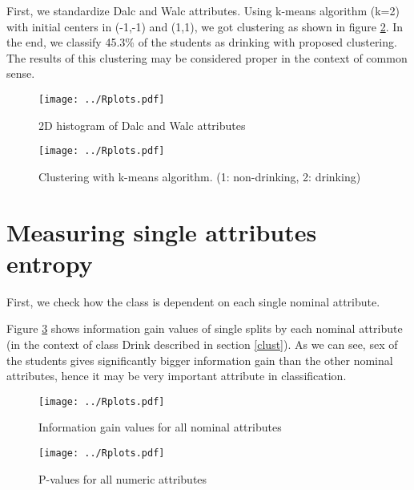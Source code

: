 \documentclass[a4paper]{article}
\begin{document}
First, we standardize Dalc and Walc attributes.
Using k-means algorithm (k=2) with initial centers in (-1,-1) and (1,1), we got clustering as shown in figure \ref{fig:clust}.
In the end, we classify 45.3\% of the students as drinking with proposed clustering.
The results of this clustering may be considered proper in the context of common sense.



\begin{figure}[!hbt]
    \centering
    \texttt{[image: ../Rplots.pdf]}
    \caption[]{2D histogram of Dalc and Walc attributes
    \label{fig:hist2D}
    }
\end{figure}

\begin{figure}[!hbt]
    \centering
    \texttt{[image: ../Rplots.pdf]}
    \caption[]{Clustering with k-means algorithm. (1: non-drinking, 2: drinking)
    \label{fig:clust}
    }
\end{figure}

\section{Measuring single attributes entropy}
\label{xent}
First, we check how the class is dependent on each single nominal attribute.

Figure \ref{fig:nominalIG} shows information gain values
of single splits by each nominal attribute (in the context of class Drink described in section \ref{clust}).
As we can see, sex of the students gives significantly bigger information gain
than the other nominal attributes, hence it may be very important attribute
in classification.

% 

\begin{figure}[!hbt]
    \centering
    \texttt{[image: ../Rplots.pdf]}
    \caption[]{Information gain values for all nominal attributes
    \label{fig:nominalIG}
    }
\end{figure}

\begin{figure}[!hbt]
    \centering
    \texttt{[image: ../Rplots.pdf]}
    \caption[]{P-values for all numeric attributes
    \label{fig:pval}
    }
\end{figure}
\end{document}

